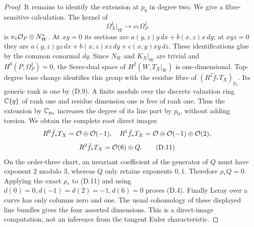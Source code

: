\begin{proof}
It remains to identify the extension at $p_0$ in degree two. We give
a fibre-sensitive calculation. The kernel of
\[
 \Omega_X^1|_W\longrightarrow\nu_*\Omega_P^1
\]
is $\nu_*\mathcal O_P\otimes N_W^*$. At $xy=0$ its sections are
$a(y,z)y\,dx+b(x,z)x\,dy$; at $xyz=0$ they are
$a(y,z)yz\,dx+b(x,z)xz\,dy+c(x,y)xy\,dz$.
These identifications glue by the common conormal $dq$.
Since $N_W$ and $K_X|_W$ are trivial and $H^0(P,\Omega_P^1)=0$, the
Serre-dual space of $H^2(W,T_X|_W)$ is one-dimensional.
Top-degree base change identifies this group with the residue fibre
of $(R^2\bar f_*T_X)_{p_0}$. Its generic rank is one by (D.9).
A finite module over the discrete valuation ring $\mathbb C\{q\}$ of rank
one and residue dimension one is free of rank one. Thus the extension
by $\mathbb C_{p_0}$ increases the degree of its line part by $p_0$, without
adding torsion. We obtain the complete root direct images
\[
 R^0\bar f_*T_X=\mathcal O\oplus\mathcal O(-1),\quad
 R^1\bar f_*T_X=\mathcal O\oplus\mathcal O(-1)\oplus\mathcal O(2),
\]
\[
 R^2\bar f_*T_X=\mathcal O(6)\oplus Q.                       \tag{D.11}
\]
On the order-three chart, an invariant coefficient of the generator
of $Q$ must have exponent $2$ modulo $3$, whereas $Q$ only retains
exponents $0,1$. Therefore $\rho_*Q=0$. Applying the exact $\rho_*$
to (D.11) and using
$d(0)=0,d(-1)=d(2)=-1,d(6)=0$ proves (D.4).
Finally Leray over a curve has only columns zero and one. The usual
cohomology of these displayed line bundles gives the four asserted
dimensions. This is a direct-image computation, not an inference from
the tangent Euler characteristic.
\end{proof}

